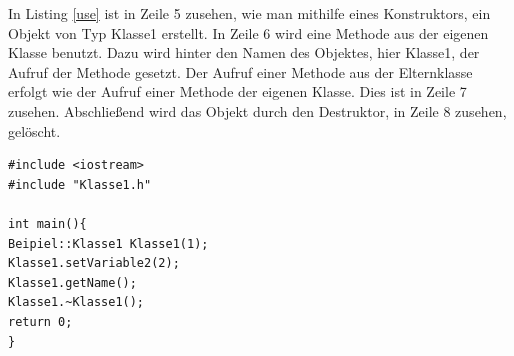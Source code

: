 In Listing \ref{use} ist in Zeile 5  zusehen, wie man mithilfe eines Konstruktors, ein Objekt von Typ Klasse1 erstellt. In Zeile 6 wird eine Methode aus der eigenen Klasse benutzt. Dazu wird hinter den Namen des Objektes, hier \glqq Klasse1\grqq{}, der Aufruf der Methode gesetzt. Der Aufruf einer Methode aus der Elternklasse erfolgt wie der Aufruf einer Methode der eigenen Klasse. Dies ist in Zeile 7 zusehen. Abschließend wird das Objekt durch den Destruktor, in Zeile 8 zusehen, gelöscht. 
\begin{lstlisting}[caption = Benutzung der Klasse,label=use]
#include <iostream>
#include "Klasse1.h"

int main(){
Beipiel::Klasse1 Klasse1(1);
Klasse1.setVariable2(2);
Klasse1.getName();
Klasse1.~Klasse1();
return 0;
}
\end{lstlisting}
\cite{HelmutErlenkotter.}
\cite{Prof.Dr.AlfredIrber.}
\cite{Krau.}
